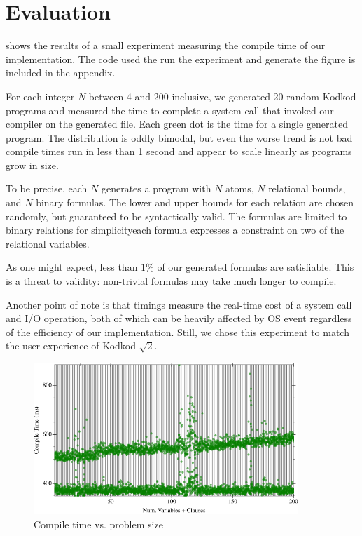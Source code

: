 \section{Evaluation}
\label{sec:eval}

 shows the results of a small experiment measuring the compile
 time of our implementation.
The code used the run the experiment and generate the figure is
 included in the appendix.

For each integer $N$ between 4 and 200 inclusive, we generated 20 random
 Kodkod programs and measured the time to complete a system call that invoked
 our compiler on the generated file.
Each green dot is the time for a single generated program.
The distribution is oddly bimodal, but even the worse trend is not bad\textemdash
 compile times run in less than 1 second and appear to scale linearly as programs
 grow in size.

To be precise, each $N$ generates a program with $N$ atoms, $N$ relational bounds,
 and $N$ binary formulas.
The lower and upper bounds for each relation are chosen randomly, but guaranteed to
 be syntactically valid.
The formulas are limited to binary relations for simplicity\textemdash each
 formula expresses a constraint on two of the relational variables.

As one might expect, less than $1\%$ of our generated formulas are satisfiable.
This is a threat to validity: non-trivial formulas may take much longer to compile.

Another point of note is that timings measure the real-time cost of a system
 call and I/O operation, both of which can be heavily affected by OS event regardless
 of the efficiency of our implementation.
Still, we chose this experiment to match the user experience of Kodkod $\sqrt{2}$.

\begin{figure}[t]
  \label{fig:bench}
  \includegraphics[width=10cm]{benchmark.png}
  \caption{Compile time vs. problem size}
\end{figure}

